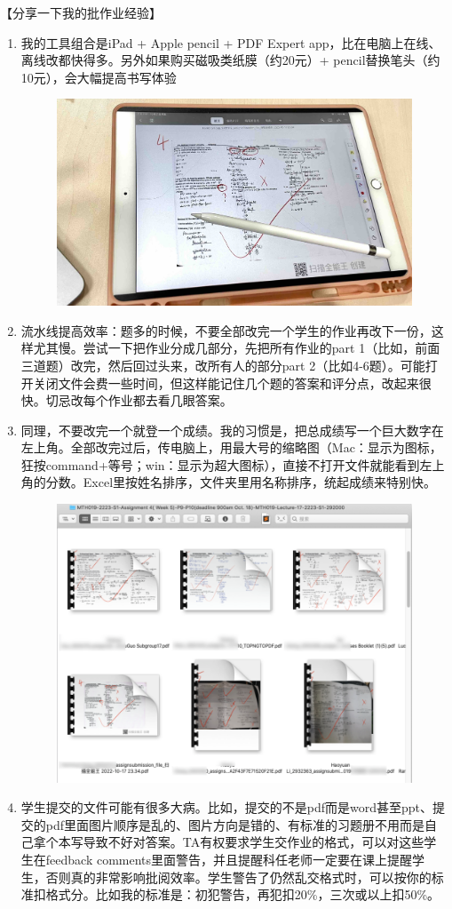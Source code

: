 \emptyline
【分享一下我的批作业经验】
\begin{enumerate}
    \item 我的工具组合是iPad + Apple pencil + PDF Expert app，比在电脑上在线、离线改都快得多。另外如果购买磁吸类纸膜（约20元）+ pencil替换笔头（约10元），会大幅提高书写体验
        \begin{figure}[H]
            \centering
            \includegraphics[width=0.5\columnwidth]{author-folder/Kai.Wu/marking_tools.jpg}
        \end{figure}
    \item 流水线提高效率：题多的时候，不要全部改完一个学生的作业再改下一份，这样尤其慢。尝试一下把作业分成几部分，先把所有作业的part 1（比如，前面三道题）改完，然后回过头来，改所有人的部分part 2（比如4-6题）。可能打开关闭文件会费一些时间，但这样能记住几个题的答案和评分点，改起来很快。切忌改每个作业都去看几眼答案。
    \item 同理，不要改完一个就登一个成绩。我的习惯是，把总成绩写一个巨大数字在左上角。全部改完过后，传电脑上，用最大号的缩略图（Mac：显示为图标，狂按command+等号；win：显示为超大图标），直接不打开文件就能看到左上角的分数。Excel里按姓名排序，文件夹里用名称排序，统起成绩来特别快。
        \begin{figure}[H]
            \centering
            \includegraphics[width=0.7\columnwidth]{author-folder/Kai.Wu/tongchengji.png}
        \end{figure}
    \item 学生提交的文件可能有很多大病。比如，提交的不是pdf而是word甚至ppt、提交的pdf里面图片顺序是乱的、图片方向是错的、有标准的习题册不用而是自己拿个本写导致不好对答案。TA有权要求学生交作业的格式，可以对这些学生在feedback comments里面警告，并且提醒科任老师一定要在课上提醒学生，否则真的非常影响批阅效率。学生警告了仍然乱交格式时，可以按你的标准扣格式分。比如我的标准是：初犯警告，再犯扣20\%，三次或以上扣50\%。

\end{enumerate}
